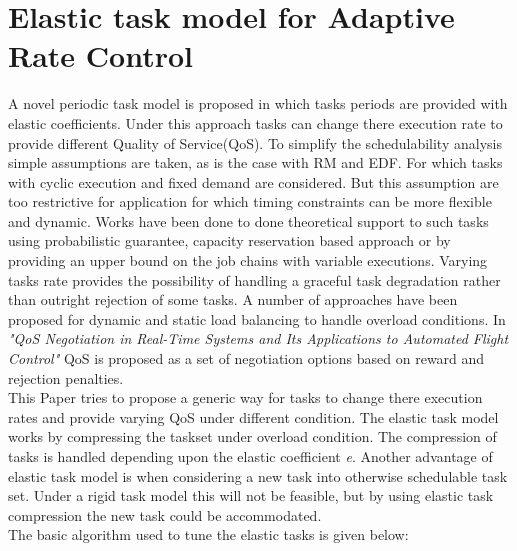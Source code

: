 \section{Elastic task model for Adaptive Rate Control}
A novel periodic task model is proposed in which tasks periods are provided with elastic coefficients. Under this approach tasks can change there execution rate to provide different Quality of Service(QoS).
To simplify the schedulability analysis simple assumptions are taken, as is the case with RM and EDF. For which tasks with cyclic execution and fixed demand are considered.
But this assumption are too restrictive for application for which timing constraints can be more flexible and dynamic.
Works have been done to done theoretical support to such tasks using probabilistic guarantee, capacity reservation based approach or by providing an upper bound on the job chains with variable executions.
Varying tasks rate provides the possibility of handling a graceful task degradation rather than outright rejection of some tasks.
A number of approaches have been proposed for dynamic and static load balancing to handle overload conditions. In \textit{"QoS Negotiation  in  Real-Time Systems  and  Its  Applications to Automated Flight Control"} QoS is proposed as a set of negotiation options based on reward and rejection penalties.\\
This Paper tries to propose a generic way for tasks to change there execution rates and provide varying QoS under different condition.
The elastic task model works by compressing the taskset under overload condition. The compression of tasks is handled depending upon the elastic coefficient \textit{e}. Another advantage of elastic task model is when considering a new task into otherwise schedulable task set. Under a rigid task model this will not be feasible, but by using elastic task compression the new task could be accommodated.\\
The basic algorithm used to tune the elastic tasks is given below:


